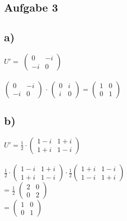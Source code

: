 \documentclass{article}
\begin{document}
	\subsection*{Aufgabe 3}
	\subsection*{a)}
	$U' =$
	$\left(
	\begin{array}{cc}
	0 & -i \\ -i&0
	\end{array}
	\right)$ \\ \\
	$\left(
	\begin{array}{cc}
	0 & -i \\ -i&0
	\end{array}
	\right)$
	$\cdot$
	$\left(
	\begin{array}{cc}
	0 & i \\ i&0
	\end{array}
	\right)$ =
	$\left(
	\begin{array}{cc}
	1 & 0 \\ 0&1
	\end{array}
	\right)$
	\subsection*{b)}
	$U' = \frac{1}{2} \cdot
	\left(
	\begin{array}{cc}
	1-i & 1+i \\ 1 + i & 1 - i
	\end{array}
	\right)
	$ \\ \\	
	$\frac{1}{2} \cdot \left(
	\begin{array}{cc}
		1-i & 1+i \\ 1 + i & 1 - i
	\end{array}
	\right)
	\cdot
	\frac{1}{2}
	\left(
	\begin{array}{cc}
	1+ i & 1-i \\ 1 - i & 1 + i
	\end{array}
	\right)
	$ \\
	=
	$\frac{1}{2}$
	$\left(
	\begin{array}{cc}
	2 & 0  \\ 0 & 2
	\end{array}
	\right)$
	\\
	=
	$\left(
	\begin{array}{cc}
	1 & 0  \\ 0 & 1
	\end{array}
	\right)$
	
\end{document}
